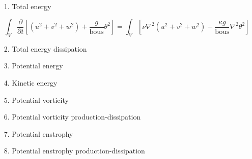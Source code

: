 \documentclass[12pt]{article}
\begin{document}
\begin{itemize}
\item[1.] Total energy

\begin{equation}
\int_V \frac{\partial}{\partial t} 
         \left[ (u^2 + v^2 + w^2) +\frac{g}{\text{bous}}
           \theta^2\right] 
= \int_V \left[ \nu \nabla^2 (u^2 + v^2 + w^2) 
                     + \frac{\kappa g}{\text{bous}} \nabla^2 \theta^2
                         \right]
\end{equation}

\item[2.] Total energy dissipation

\item[3.] Potential energy

\item[4.] Kinetic energy

\item[5.] Potential vorticity

\item[6.] Potential vorticity production-dissipation

\item[7.] Potential enstrophy

\item[8.] Potential enstrophy production-dissipation

\end{itemize}
\end{document}
